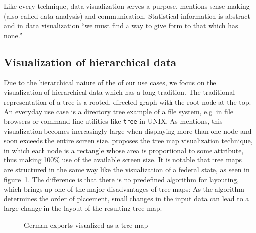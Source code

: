 \documentclass{article}
\begin{document}
Like every technique, data visualization serves a purpose.
\textcite{Few2013} mentions sense-making (also called data analysis) and communication.
Statistical information is abstract and in data visualization ``we must find a way to give form to that which has none.''\cite{Few2013}



\subsection{Visualization of hierarchical data}
Due to the hierarchical nature of the of our use cases, we focus on the visualization of hierarchical data which has a long tradition.
The traditional representation of a tree is a rooted, directed graph with the root node at the top.
An everyday use case is a directory tree example of a file system, e.g. in file browsers or command line utilities like \texttt{tree} in UNIX.
As \textcite{Shneiderman1992} mentions, this visualization becomes increasingly large when displaying more than one node and soon exceeds the entire screen size.
\textcite{Johnson1991} proposes the tree map visualization technique, in which each node is a rectangle whose area is proportional to some attribute, thus making 100\% use of the available screen size.
It is notable that tree maps are structured in the same way like the visualization of a federal state, as seen in figure~\ref{fig:research:treemap}.
The difference is that there is no predefined algorithm for layouting, which brings up one of the major disadvantages of tree maps:
As the algorithm determines the order of placement, small changes in the input data can lead to a large change in the layout of the resulting tree map.

\begin{figure}[h]
\centering
\caption{German exports visualized as a tree map}
\label{fig:research:treemap}
\end{figure}
\end{document}
